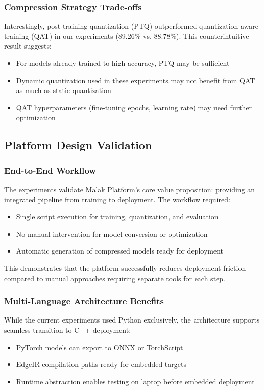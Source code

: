 \subsubsection{Compression Strategy Trade-offs}
Interestingly, post-training quantization (PTQ) outperformed quantization-aware training (QAT) in our experiments (89.26\% vs. 88.78\%). This counterintuitive result suggests:
\begin{itemize}
\item For models already trained to high accuracy, PTQ may be sufficient
\item Dynamic quantization used in these experiments may not benefit from QAT as much as static quantization
\item QAT hyperparameters (fine-tuning epochs, learning rate) may need further optimization
\end{itemize}

\subsection{Platform Design Validation}

\subsubsection{End-to-End Workflow}
The experiments validate Malak Platform's core value proposition: providing an integrated pipeline from training to deployment. The workflow required:
\begin{itemize}
\item Single script execution for training, quantization, and evaluation
\item No manual intervention for model conversion or optimization
\item Automatic generation of compressed models ready for deployment
\end{itemize}

This demonstrates that the platform successfully reduces deployment friction compared to manual approaches requiring separate tools for each step.

\subsubsection{Multi-Language Architecture Benefits}
While the current experiments used Python exclusively, the architecture supports seamless transition to C++ deployment:
\begin{itemize}
\item PyTorch models can export to ONNX or TorchScript
\item EdgeIR compilation paths ready for embedded targets
\item Runtime abstraction enables testing on laptop before embedded deployment
\end{itemize}

